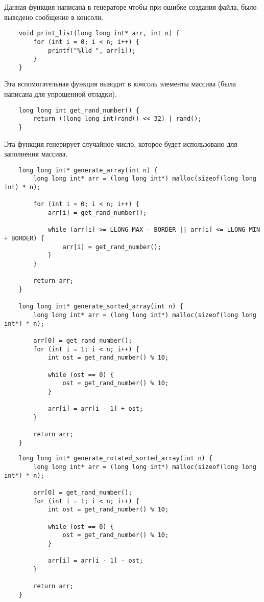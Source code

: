 \documentclass[a4paper,12pt,titlepage,finall]{article}
\begin{document}
Данная функция написана в генераторе чтобы при ошибке создания файла, было выведено сообщение в консоли.

\begin{verbatim}
    void print_list(long long int* arr, int n) {
        for (int i = 0; i < n; i++) {
            printf("%lld ", arr[i]);
        }
    }
\end{verbatim}

Эта вспомогательная функция выводит в консоль элементы массива (была написана для упрощенной отладки).

\begin{verbatim}
    long long int get_rand_number() {
        return ((long long int)rand() << 32) | rand();
    }
\end{verbatim}

Эта функция генерирует случайное число, которое будет использовано для заполнения массива.

\begin{verbatim}
    long long int* generate_array(int n) {
        long long int* arr = (long long int*) malloc(sizeof(long long int) * n);

        for (int i = 0; i < n; i++) {
            arr[i] = get_rand_number();

            while (arr[i] >= LLONG_MAX - BORDER || arr[i] <= LLONG_MIN + BORDER) {
                arr[i] = get_rand_number();
            }
        }

        return arr;
    }

    long long int* generate_sorted_array(int n) {
        long long int* arr = (long long int*) malloc(sizeof(long long int*) * n);

        arr[0] = get_rand_number();
        for (int i = 1; i < n; i++) {
            int ost = get_rand_number() % 10;
            
            while (ost == 0) {
                ost = get_rand_number() % 10;
            }

            arr[i] = arr[i - 1] + ost;
        }

        return arr;
    }
\end{verbatim}

\newpage

\begin{verbatim}
    long long int* generate_rotated_sorted_array(int n) {
        long long int* arr = (long long int*) malloc(sizeof(long long int*) * n);

        arr[0] = get_rand_number();
        for (int i = 1; i < n; i++) {
            int ost = get_rand_number() % 10;
            
            while (ost == 0) {
                ost = get_rand_number() % 10;
            }

            arr[i] = arr[i - 1] - ost;
        }

        return arr;
    }
\end{verbatim}
\end{document}
